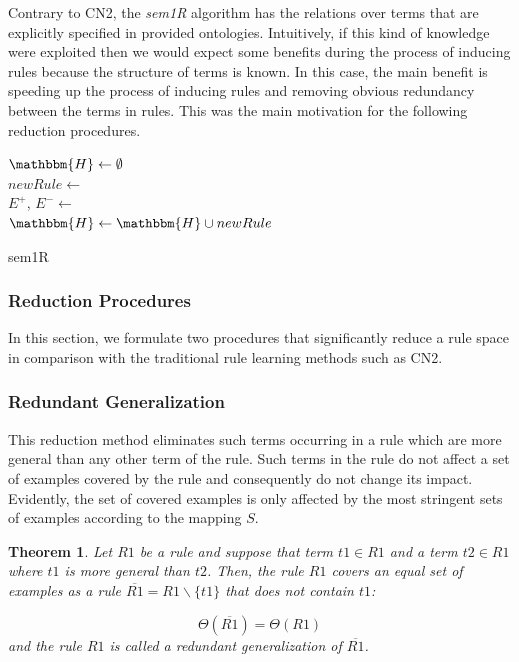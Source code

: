 \documentclass{bmcart}
\newtheorem{theorem}{Theorem}
\begin{document}
Contrary to CN2, the \emph{sem1R} algorithm has the relations over terms that are explicitly specified in provided ontologies. Intuitively, if this kind of knowledge were exploited then we would expect some benefits during the process of inducing rules because the structure of terms is known. In this case, the main benefit is speeding up the process of inducing rules and removing obvious redundancy between the terms in rules. This was the main motivation for the following reduction procedures.


\begin{algorithm}[!t]
\BlankLine
$\mathbbm{H} \leftarrow \emptyset$\\
{
    $newRule \leftarrow$ \\
    $E^{+}$, $E^{-} \leftarrow$ \\
	$\mathbbm{H} \leftarrow \mathbbm{H} \cup newRule$\\
}
\caption{sem1R}\label{algo_sem1r}
\end{algorithm}



\subsubsection*{Reduction Procedures}\label{sec:reduction_procedures}
In this section, we formulate two procedures that significantly reduce a rule space in comparison with the traditional rule learning methods such as CN2.

\subsubsection*{Redundant Generalization}
This reduction method eliminates such terms occurring in a rule which are more general than any other term of the rule. Such terms in the rule do not affect a set of examples covered by the rule and consequently do not change its impact. Evidently, the set of covered examples is only affected by the most stringent sets of examples according to the mapping $S$.
\begin{theorem}
Let $R1$ be a rule and suppose that term $t1 \in R1$ and a term $t2 \in R1$ where $t1$ is more general than $t2$. Then, the rule $R1$ covers an equal set of examples as a rule $\overline{R1} = R1 \backslash \{t1\}$ that does not contain $t1$: 

$$\Theta(\overline{R1}) = \Theta(R1)$$
and the rule $R1$ is called a \textit{redundant generalization} of $\overline{R1}$.
\end{theorem}
\end{document}
